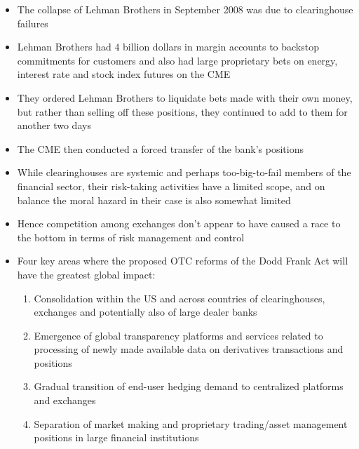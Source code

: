 \documentclass[11pt]{beamer}
\begin{document}
\begin{frame}
\begin{itemize}
\item The collapse of Lehman Brothers in September 2008 was due to clearinghouse failures
\item Lehman Brothers had $4$ billion dollars in margin accounts to backstop commitments for customers and also had large proprietary bets on energy, interest rate and stock index futures on the CME
\item They ordered Lehman Brothers to liquidate bets made with their own money, but rather than selling off these positions, they continued to add to them for another two days
\item The CME then conducted a forced transfer of the bank’s positions
\end{itemize}
\end{frame}

\begin{frame}
\begin{itemize}
\item While clearinghouses are systemic and perhaps too-big-to-fail members of the financial sector, their risk-taking activities have a limited scope, and on balance the moral hazard in their case is also somewhat limited
\item Hence competition among exchanges don't appear to have caused a race to the bottom in terms of risk management and control
\end{itemize}
\end{frame}

\begin{frame}
\begin{itemize}
\item Four key areas where the proposed OTC reforms of the Dodd Frank Act will have the greatest global impact:
\begin{enumerate}
\item Consolidation within the US and across countries of clearinghouses, exchanges and potentially also of large dealer banks
\item Emergence of global transparency platforms and services related to processing of newly made available data on derivatives transactions and positions
\item Gradual transition of end-user hedging demand to centralized platforms and exchanges
\item Separation of market making and proprietary trading/asset management positions in large financial institutions
\end{enumerate}
\end{itemize}
\end{frame}
\end{document}
